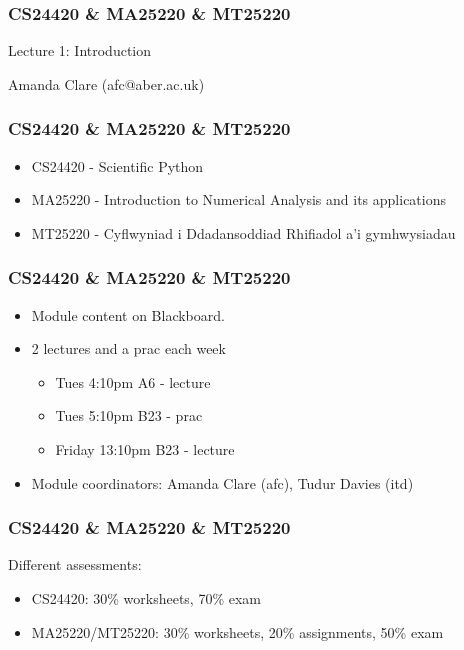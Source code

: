 \documentclass{beamer}
\begin{document}
\begin{frame}
\frametitle{CS24420 \& MA25220 \& MT25220}

\begin{center}
\begin{huge}
Lecture 1: Introduction 
\end{huge}
\bigskip

Amanda Clare (afc@aber.ac.uk)

\end{center}
\end{frame}

\begin{frame}
\frametitle{CS24420 \& MA25220 \& MT25220}
\begin{itemize}
\item CS24420 - Scientific Python
\item MA25220 - Introduction to Numerical Analysis and its
  applications
\item MT25220 - Cyflwyniad i Ddadansoddiad Rhifiadol a'i gymhwysiadau
\end{itemize}
\end{frame}

\begin{frame}
\frametitle{CS24420 \& MA25220 \& MT25220}
\begin{itemize}
\item Module content on Blackboard.
\item 2 lectures and a prac each week
\begin{itemize}
\item Tues 4:10pm A6 - lecture
\item Tues 5:10pm B23 - prac
\item Friday 13:10pm B23 - lecture 
\end{itemize}
\item Module coordinators: Amanda Clare (afc), Tudur Davies (itd)
\end{itemize}
\end{frame}

\begin{frame}
\frametitle{CS24420 \& MA25220 \& MT25220}
Different assessments:
\begin{itemize}
\item CS24420: 30\% worksheets, 70\% exam
\item MA25220/MT25220: 30\% worksheets, 20\% assignments, 50\% exam
\end{itemize}
\end{frame}
\end{document}
